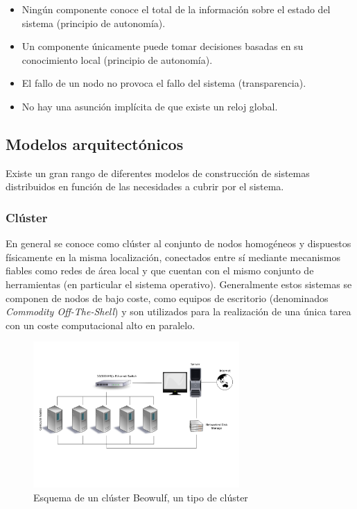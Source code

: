 \begin{itemize}
\item Ningún componente conoce el total de la información sobre el estado del sistema (principio de autonomía).
\item Un componente únicamente puede tomar decisiones basadas en su conocimiento local (principio de autonomía).
\item El fallo de un nodo no provoca el fallo del sistema (transparencia).
\item No hay una asunción implícita de que existe un reloj global.
\end{itemize}

\subsection{Modelos arquitectónicos}

Existe un gran rango de diferentes modelos de construcción de sistemas distribuidos en función de las necesidades a cubrir por el sistema.


\subsubsection{Clúster}

En general se conoce como clúster al conjunto de nodos homogéneos y dispuestos físicamente en la misma localización, conectados entre sí mediante mecanismos fiables como redes de área local y que cuentan con el mismo conjunto de herramientas (en particular el sistema operativo). Generalmente estos sistemas se componen de nodos de bajo coste, como equipos de escritorio (denominados \textit{Commodity Off-The-Shell}) y son utilizados para la realización de una única tarea con un coste computacional alto en paralelo.



\begin{figure}[H]
\centering
\includegraphics[width=0.7\textwidth]{Chapter2/Figures/Beowulf.png}
\caption{Esquema de un clúster Beowulf, un tipo de clúster}
\label{fig:beowulf}
\end{figure}

